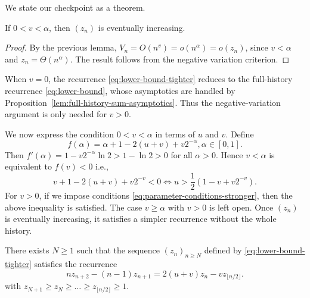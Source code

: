We state our checkpoint as a theorem.

\begin{theorem}
  \label{thm:eventually-increasing}
  If $0<v < \alpha$, then $(z_n)$ is eventually increasing.
\end{theorem}

\begin{proof}
  By the previous lemma, $V_n=O(n^v)=o(n^\alpha)=o(z_n)$, since $v<\alpha$ and $z_n=\Theta(n^\alpha)$. The result follows from the negative variation criterion.
\end{proof}

When $v=0$, the recurrence \eqref{eq:lower-bound-tighter} reduces to the full-history recurrence \eqref{eq:lower-bound}, whose asymptotics are handled by Proposition~\ref{lem:full-history-sum-asymptotics}. Thus the negative-variation argument is only needed for $v>0$.

We now express the condition $0<v < \alpha$ in terms of $u$ and $v$. Define
$$f(\alpha) = \alpha + 1 - 2(u + v) + v 2^{-\alpha}, \alpha\in[0,1].$$
Then $f'(\alpha) = 1 - v2^{-\alpha}\ln2 > 1-\ln2 > 0$ for all $\alpha > 0$. Hence $v < \alpha$ is equivalent to $f(v) < 0$ i.e.,
$$v + 1 - 2(u + v) + v 2^{-v} < 0 \iff u > \frac{1}{2}(1 - v + v 2^{-v}).$$
For $v>0$, if we impose conditions \eqref{eq:parameter-conditions-stronger}, then the above inequality is satisfied. The case $v\ge \alpha$ with $v>0$ is left open. Once $(z_n)$ is eventually increasing, it satisfies a simpler recurrence without the whole history.

\begin{lemma}
  There exists $N\ge 1$ such that the sequence $(z_n)_{n\ge N}$ defined by \ref{eq:lower-bound-tighter} satisfies the recurrence
  \begin{equation}
    \label{eq:delayed-recurrence}
    nz_{n+2}-(n-1)z_{n+1} = 2(u+v)z_{n} - vz_{\lfloor n/2\rfloor}.
  \end{equation}
  with $z_{N+1} \ge z_{N} \ge \ldots \ge z_{\lfloor n/2\rfloor} \ge 1$.
\end{lemma}

